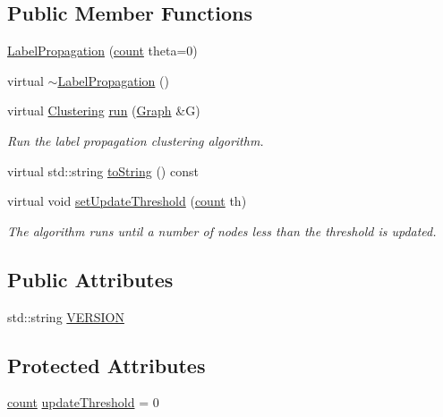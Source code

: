 \subsection*{Public Member Functions}
\begin{DoxyCompactItemize}
\item 
\hyperlink{class_networ_kit_1_1_label_propagation_a4a9267898177f7470717dca8d93de685}{Label\-Propagation} (\hyperlink{namespace_networ_kit_a76b399edfa50ae72e4aa86007aaa800a}{count} theta=0)
\item 
virtual \hyperlink{class_networ_kit_1_1_label_propagation_a0c0d1e07f66033a77000b4454bcfeea0}{$\sim$\-Label\-Propagation} ()
\item 
virtual \hyperlink{class_networ_kit_1_1_clustering}{Clustering} \hyperlink{class_networ_kit_1_1_label_propagation_ae944bf5e3bb44ce6b76a70f6071c3b31}{run} (\hyperlink{class_networ_kit_1_1_graph}{Graph} \&G)
\begin{DoxyCompactList}\small\item\em Run the label propagation clustering algorithm. \end{DoxyCompactList}\item 
virtual std\-::string \hyperlink{class_networ_kit_1_1_label_propagation_a3e90c309b7463ebe1934ef2560bae6ba}{to\-String} () const 
\item 
virtual void \hyperlink{class_networ_kit_1_1_label_propagation_a1525c6b6610b9183c127edb318ebf552}{set\-Update\-Threshold} (\hyperlink{namespace_networ_kit_a76b399edfa50ae72e4aa86007aaa800a}{count} th)
\begin{DoxyCompactList}\small\item\em The algorithm runs until a number of nodes less than the threshold is updated. \end{DoxyCompactList}\end{DoxyCompactItemize}
\subsection*{Public Attributes}
\begin{DoxyCompactItemize}
\item 
std\-::string \hyperlink{class_networ_kit_1_1_label_propagation_a5989d3beabf4c62dfc6d34d5e5a2bfcd}{V\-E\-R\-S\-I\-O\-N}
\end{DoxyCompactItemize}
\subsection*{Protected Attributes}
\begin{DoxyCompactItemize}
\item 
\hyperlink{namespace_networ_kit_a76b399edfa50ae72e4aa86007aaa800a}{count} \hyperlink{class_networ_kit_1_1_label_propagation_a017f935395202a754b9baeb83755ddf5}{update\-Threshold} = 0
\end{DoxyCompactItemize}


